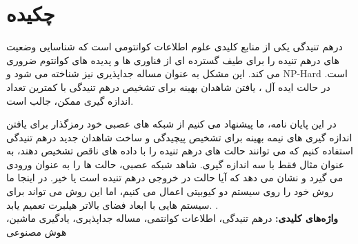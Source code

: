 
\section*{چکیده}
\begin{spacing}{2}

درهم تنیدگی یکی از منابع کلیدی علوم اطلاعات کوانتومی است که شناسایی وضعیت های درهم تنیده را برای طیف گسترده ای از فناوری ها و پدیده های کوانتوم ضروری می کند. این مشکل به عنوان مساله جداپذیری نیز شناخته می شود و NP-Hard است. در حالت ایده آل ، یافتن شاهدان بهینه برای تشخیص درهم تنیدگی با کمترین تعداد اندازه گیری ممکن، جالب است.

در این پایان نامه، ما پیشنهاد می کنیم از شبکه های عصبی خود رمزگذار برای یافتن اندازه گیری های نیمه بهینه برای تشخیص پیچیدگی و ساخت شاهدان جدید درهم تنیدگی استفاده کنیم که می توانند حالت های درهم تنیده را با داده های ناقص تشخیص دهند، به عنوان مثال فقط با سه اندازه گیری. شاهد شبکه عصبی، حالت ها را به عنوان ورودی می گیرد و نشان می دهد که آیا حالت در خروجی درهم تنیده است یا خیر. در اینجا ما روش خود را روی سیستم دو کیوبیتی اعمال می کنیم، اما این روش می تواند برای سیستم هایی با ابعاد فضای بالاتر هیلبرت تعمیم یابد.
.\\

\textbf{واژه‌های کلیدی:}
درهم تنیدگی، اطلاعات کوانتمی، مساله جداپذیری، یادگیری ماشین، هوش مصنوعی
\end{spacing}

\newpage\null\newpage
